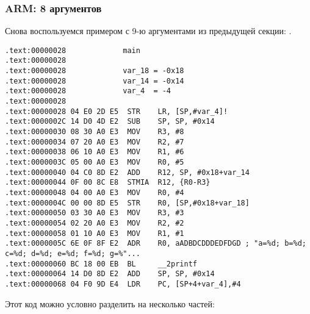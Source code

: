 \subsubsection{ARM: 8 аргументов}

Снова воспользуемся примером с 9-ю аргументами из предыдущей секции: .



\myparagraph{\OptimizingKeilVI: \ARMMode}

\begin{lstlisting}[style=customasmARM]
.text:00000028             main
.text:00000028
.text:00000028             var_18 = -0x18
.text:00000028             var_14 = -0x14
.text:00000028             var_4  = -4
.text:00000028
.text:00000028 04 E0 2D E5  STR    LR, [SP,#var_4]!
.text:0000002C 14 D0 4D E2  SUB    SP, SP, #0x14
.text:00000030 08 30 A0 E3  MOV    R3, #8
.text:00000034 07 20 A0 E3  MOV    R2, #7
.text:00000038 06 10 A0 E3  MOV    R1, #6
.text:0000003C 05 00 A0 E3  MOV    R0, #5
.text:00000040 04 C0 8D E2  ADD    R12, SP, #0x18+var_14
.text:00000044 0F 00 8C E8  STMIA  R12, {R0-R3}
.text:00000048 04 00 A0 E3  MOV    R0, #4
.text:0000004C 00 00 8D E5  STR    R0, [SP,#0x18+var_18]
.text:00000050 03 30 A0 E3  MOV    R3, #3
.text:00000054 02 20 A0 E3  MOV    R2, #2
.text:00000058 01 10 A0 E3  MOV    R1, #1
.text:0000005C 6E 0F 8F E2  ADR    R0, aADBDCDDDEDFDGD ; "a=%d; b=%d; c=%d; d=%d; e=%d; f=%d; g=%"...
.text:00000060 BC 18 00 EB  BL     __2printf
.text:00000064 14 D0 8D E2  ADD    SP, SP, #0x14
.text:00000068 04 F0 9D E4  LDR    PC, [SP+4+var_4],#4
\end{lstlisting}

Этот код можно условно разделить на несколько частей:

